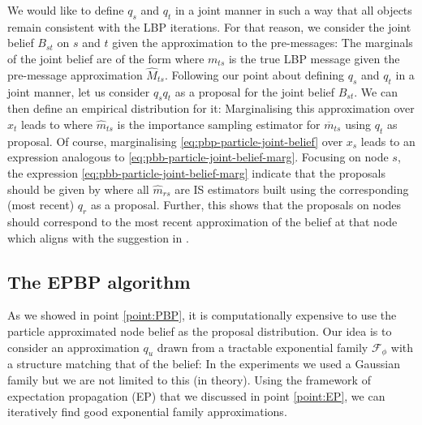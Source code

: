 We would like to define $q_{s}$ and $q_{t}$ in a joint manner in such a way that all objects remain consistent with the LBP iterations. For that reason, we consider the joint belief $ B_{st}$ on $s$ and $t$ given the approximation to the pre-messages:
%
%
The marginals of the joint belief are of the form
%
%
where $m_{ts}$ is the true LBP message given the pre-message approximation $\widehat M_{ts}$.
Following our point about defining $q_{s}$ and $q_{t}$ in a joint manner, let us consider $q_{s}q_{t}$ as a proposal for the joint belief $ B_{st}$.
We can then define an empirical distribution for it:
%
%
Marginalising this approximation over $x_{t}$ leads to
%
%
where $\widehat{m}_{ts}$ is the importance sampling estimator for $\overline m_{ts}$ using $q_{t}$ as proposal. Of course, marginalising \eqref{eq:pbp-particle-joint-belief} over $x_{s}$ leads to an expression analogous to \eqref{eq:pbb-particle-joint-belief-marg}. Focusing on node $s$, the expression \eqref{eq:pbb-particle-joint-belief-marg} indicate that the proposals should be given by
%
where all $\widehat m_{rs}$ are IS estimators built using the corresponding (most recent) $q_{r}$ as a proposal. Further, this shows that the proposals on nodes should correspond to the most recent approximation of the belief at that node which aligns with the suggestion in \citet{ihler09}.

\subsection{The EPBP algorithm}
As we showed in point \ref{point:PBP}, it is computationally expensive to use the particle approximated node belief as the proposal distribution. 
Our idea is to consider an approximation $q_{u}$ drawn from a tractable exponential family $\mathcal F_{\phi}$ with a structure matching that of the belief:
%
%
In the experiments we used a Gaussian family but we are not limited to this (in theory).
Using the framework of expectation propagation (EP) that we discussed in point \ref{point:EP}, we can iteratively find good exponential family approximations.\\

